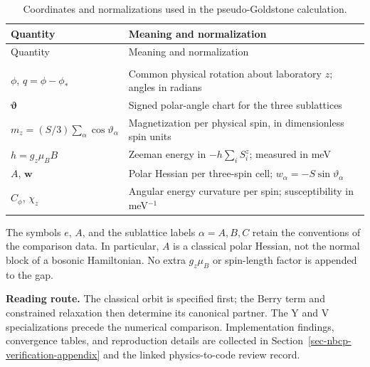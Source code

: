 \begin{longtable}[]{@{}
  >{\raggedright\arraybackslash}p{}
  >{\raggedright\arraybackslash}p{}@{}}
\toprule\noalign{}
\begin{minipage}[b]{\linewidth}\raggedright
Quantity
\end{minipage} & \begin{minipage}[b]{\linewidth}\raggedright
Meaning and normalization
\end{minipage} \\
\midrule\noalign{}
\endfirsthead
\toprule\noalign{}
\begin{minipage}[b]{\linewidth}\raggedright
Quantity
\end{minipage} & \begin{minipage}[b]{\linewidth}\raggedright
Meaning and normalization
\end{minipage} \\
\midrule\noalign{}
\endhead
\bottomrule\noalign{}
\caption{Coordinates and normalizations used in the pseudo-Goldstone calculation.}\label{tab-nbcp-a-pseudo-goldstone-gap-1}\\
\endlastfoot
\(\phi\), \(q=\phi-\phi_*\) & Common physical rotation about laboratory
\(z\); angles in radians \\
\(\boldsymbol\vartheta\) & Signed polar-angle chart for the three
sublattices \\
\(m_z=(S/3)\sum_\alpha\cos\vartheta_\alpha\) & Magnetization per
physical spin, in dimensionless spin units \\
\(h=g_z\mu_B B\) & Zeeman energy in \(-h\sum_i S_i^z\); measured in
meV \\
\(A\), \(\mathbf w\) & Polar Hessian per three-spin cell;
\(w_\alpha=-S\sin\vartheta_\alpha\) \\
\(C_\phi\), \(\chi_z\) & Angular energy curvature per spin;
susceptibility in meV\(^{-1}\) \\
\end{longtable}

The symbols \(e\), \(A\), and the sublattice labels \(\alpha=A,B,C\)
retain the conventions of the comparison data. In particular, \(A\) is a
classical polar Hessian, not the normal block of a bosonic Hamiltonian.
No extra \(g_z\mu_B\) or spin-length factor is appended to the gap.

\textbf{Reading route.} The classical orbit is specified first; the
Berry term and constrained relaxation then determine its canonical
partner. The Y and V specializations precede the numerical comparison.
Implementation findings, convergence tables, and reproduction details
are collected in Section~\ref{sec-nbcp-verification-appendix} and the
linked physics-to-code review record.

